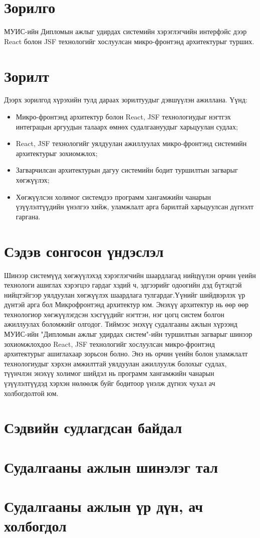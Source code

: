 
\section{Зорилго}
	\quad \quad	МУИС-ийн Дипломын ажлыг удирдах системийн хэрэглэгчийн интерфэйс дээр React болон JSF технологийг хослуулсан микро-фронтэнд архитектурыг турших.

\section{Зорилт}
	\quad \quad	Дээрх зорилгод хүрэхийн тулд дараах зорилтуудыг дэвшүүлэн ажиллана. Үүнд:
	\begin{itemize}
		\item Микро-фронтэнд архитектур болон React, JSF технологиудыг нэгтгэх интеграцын аргуудын талаарх өмнөх судалгаануудыг харьцуулан судлах;
		\item React, JSF технологийг уялдуулан ажиллуулах микро-фронтэнд системийн архитектурыг зохиомжлох;
		\item Загварчилсан архитектурын дагуу системийн бодит туршилтын загварыг хөгжүүлэх;
		\item Хөгжүүлсэн холимог системдээ программ хангамжийн чанарын үзүүлэлтүүдийн үнэлгээ хийж, уламжлалт арга барилтай харьцуулсан дүгнэлт гаргана.
	\end{itemize}

\section{Сэдэв сонгосон үндэслэл}
	\quad \quad	Шинээр системүүд хөгжүүлэхэд хэрэглэгчийн шаардлагад нийцүүлэн орчин үеийн технологи ашиглах хэрэгцээ гардаг хэдий ч, эдгээрийг одоогийн дэд бүтэцтэй нийцтэйгээр уялдуулан хөгжүүлэх шаардлага тулгардаг.Үүнийг шийдвэрлэх үр дүнтэй арга бол Микрофронтэнд архитектур юм. Энэхүү архитектур нь өөр өөр технологиор хөгжүүлэгдсэн хэсгүүдийг нэгтгэн, нэг цогц систем болгон ажиллуулах боломжийг олгодог. Тиймээс энэхүү судалгааны ажлын хүрээнд МУИС-ийн "Дипломын ажлыг удирдах систем"-ийн туршилтын загварыг шинээр зохиомжлохдоо React, JSF технологийг хослуулсан микро-фронтэнд архитектурыг ашиглахаар зорьсон болно. Энэ нь орчин үеийн болон уламжлалт технологиудыг хэрхэн амжилттай уялдуулан ажиллуулж болохыг судлах, түүнчлэн энэхүү холимог шийдэл нь программ хангамжийн чанарын үзүүлэлтүүдэд хэрхэн нөлөөлж буйг бодитоор үнэлж дүгнэх чухал ач холбогдолтой юм.
\section{Сэдвийн судлагдсан байдал}

\section{Судалгааны ажлын шинэлэг тал}

\section{Судалгааны ажлын үр дүн, ач холбогдол}
